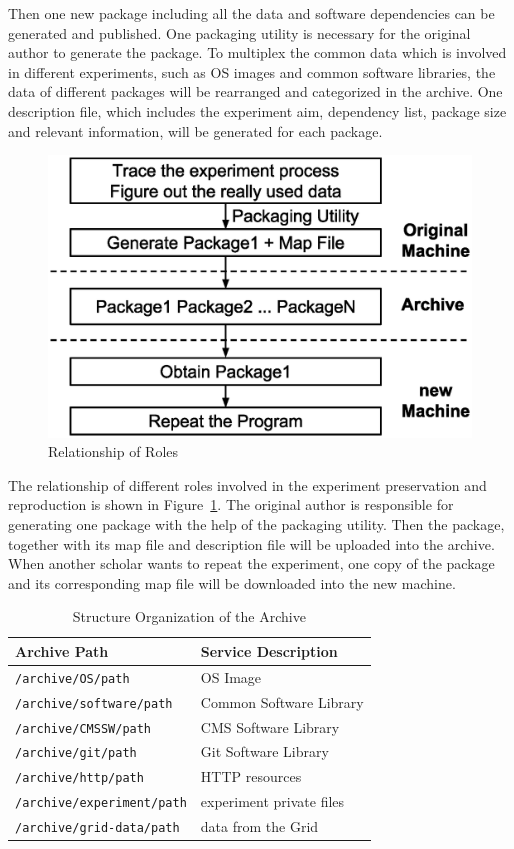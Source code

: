 \documentclass{acm_proc_article-sp}
\begin{document}
Then one new package including all the data and software dependencies can be generated and published. 
One packaging utility is necessary for the original author to generate the package. 
To multiplex the common data which is involved in different experiments, such as OS images and common software libraries, the data of different packages will be rearranged and categorized in the archive.
One description file, which includes the experiment aim, dependency list,  package size and relevant information, will be generated for each package.

\begin{figure}
\centering
\includegraphics[width=.8\columnwidth]{solution3.eps}
\caption{Relationship of Roles}
\label{fig:solution3}
\end{figure}

The relationship of different roles involved in the experiment preservation and
reproduction is shown in Figure~\ref{fig:solution3}.  The original author is
responsible for generating one package with the help of the packaging utility. Then the package, together with
its map file and description file will be uploaded into the archive. When
another scholar wants to repeat the experiment, one copy of the package and its
corresponding map file will be downloaded into the new machine.

\begin{table}
    \centering
    \begin{tabular}{|l|l|}
        \hline
        \bf Archive Path & \bf Service Description \\ \hline
        {\tt /archive/OS/path} & OS Image \\ \hline
        {\tt /archive/software/path} & Common Software Library \\ \hline
        {\tt /archive/CMSSW/path} & CMS Software Library \\ \hline
        {\tt /archive/git/path} & Git Software Library \\ \hline
        {\tt /archive/http/path} & HTTP resources \\ \hline
        {\tt /archive/experiment/path} & experiment private files \\ \hline
        {\tt /archive/grid-data/path} & data from the Grid \\ \hline
    \end{tabular}
    \caption{Structure Organization of the Archive}
    \label{table:archive-map}
\end{table}
\end{document}
